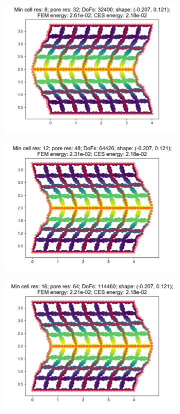 \begin{figure}[H]
\begin{subfigure}{.45\textwidth}
\end{subfigure}
\begin{subfigure}{.45\textwidth}
  \centering
  \includegraphics[width=.8\linewidth]{lces/vis_compression/bm_3_mesh_3.png}
\end{subfigure}
\newline
\begin{subfigure}{.45\textwidth}
  \centering
  \includegraphics[width=.8\linewidth]{lces/vis_compression/bm_3_mesh_4.png}
\end{subfigure}
\begin{subfigure}{.45\textwidth}
  \centering
  \includegraphics[width=.8\linewidth]{lces/vis_compression/bm_3_mesh_5.png}
\end{subfigure}
\end{figure}

